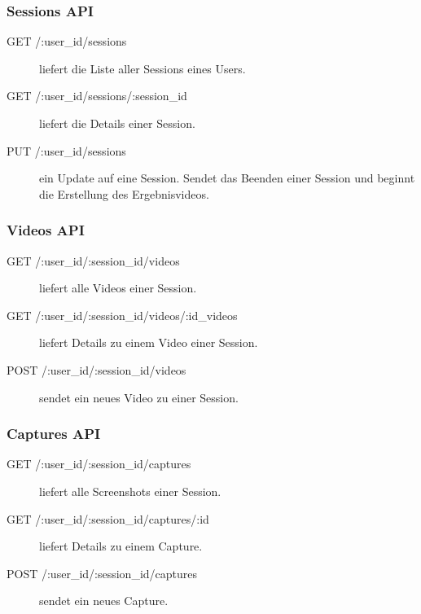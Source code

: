 \subsubsection{Sessions API}

\begin{description}
	\item[GET /:user\_id/sessions] liefert die Liste aller Sessions eines Users.
	
	\item[GET /:user\_id/sessions/:session\_id] liefert die Details einer Session. 
	
	\item[PUT /:user\_id/sessions] ein Update auf eine Session. Sendet das Beenden einer Session und beginnt die Erstellung des Ergebnisvideos.
\end{description}


\subsubsection{Videos API}

\begin{description}
	\item[GET /:user\_id/:session\_id/videos] liefert alle Videos einer Session.
	
	\item[GET /:user\_id/:session\_id/videos/:id\_videos] liefert Details zu einem Video einer Session.
	
	\item[POST /:user\_id/:session\_id/videos] sendet ein neues Video zu einer Session.
\end{description}


\subsubsection{Captures API}

\begin{description}
	\item[GET /:user\_id/:session\_id/captures] liefert alle Screenshots einer Session.
	
	\item[GET /:user\_id/:session\_id/captures/:id] liefert Details zu einem Capture.
	
	\item[POST /:user\_id/:session\_id/captures] sendet ein neues Capture.

\end{description}

